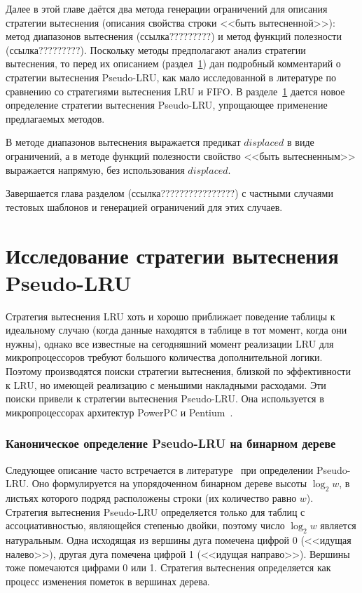 \documentclass[14pt]{extreport}
\newcommand{\LRU}{\textsf{LRU}\xspace}
\newcommand{\FIFO}{\textsf{FIFO}\xspace}
\newcommand{\PseudoLRU}{\textsf{Pseudo-LRU}\xspace}
\begin{document}
Далее в этой главе даётся два метода генерации ограничений для описания стратегии вытеснения (описания свойства строки <<быть вытесненной>>): метод диапазонов вытеснения (ссылка?????????) и метод функций полезности (ссылка?????????). Поскольку методы предполагают анализ стратегии вытеснения, то перед их описанием (раздел~\ref{sec:plru_new_definition}) дан подробный комментарий о стратегии вытеснения \PseudoLRU, как мало исследованной в литературе по сравнению со стратегиями вытеснения \LRU и \FIFO. В разделе~\ref{sec:plru_new_definition} дается новое определение стратегии вытеснения \PseudoLRU, упрощающее применение предлагаемых методов.

В методе диапазонов вытеснения выражается предикат $displaced$ в виде ограничений, а в методе функций полезности свойство <<быть вытесненным>> выражается напрямую, без использования $displaced$.

Завершается глава разделом (ссылка????????????????) с частными случаями тестовых шаблонов и генерацией ограничений для этих случаев.

\section{Исследование стратегии вытеснения \PseudoLRU}\label{sec:plru_new_definition}

Стратегия вытеснения \LRU хоть и хорошо приближает поведение
таблицы к идеальному случаю (когда данные находятся в
таблице в тот момент, когда они нужны), однако все известные на
сегодняшний момент реализации \LRU для микропроцессоров требуют большого
количества дополнительной логики. Поэтому производятся поиски
стратегии вытеснения, близкой по эффективности к \LRU, но имеющей
реализацию с меньшими накладными расходами. Эти поиски привели к
стратегии вытеснения \PseudoLRU. Она используется в микропроцессорах архитектур PowerPC и Pentium~\cite{FundamentalOfComputerOrganizationAndDesign}.

\subsubsection{Каноническое определение \PseudoLRU на бинарном дереве}

Следующее описание часто встречается в
литературе~\cite{FundamentalOfComputerOrganizationAndDesign} при
определении \PseudoLRU. Оно формулируется на
упорядоченном бинарном дереве высоты $\log_2 w$, в листьях которого
подряд расположены строки (их количество равно $w$). Стратегия вытеснения \PseudoLRU
определяется только для таблиц с ассоциативностью, являющейся степенью двойки, поэтому число $\log_2 w$ является натуральным. Одна исходящая из вершины дуга помечена цифрой 0 (<<идущая налево>>), другая дуга помечена цифрой 1 (<<идущая направо>>). Вершины тоже помечаются цифрами 0 или 1. Стратегия вытеснения определяется как процесс изменения пометок в вершинах дерева.
\end{document}
